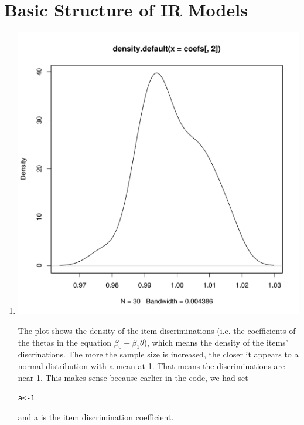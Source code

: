 \documentclass{article}\usepackage[]{graphicx}\usepackage[]{color}
\makeatletter
\def\maxwidth{ %
  \ifdim\Gin@nat@width>\linewidth
    \linewidth
  \else
    \Gin@nat@width
  \fi
}
\newcommand{\hlnum}[1]{\textcolor[rgb]{0.686,0.059,0.569}{#1}}%
\newcommand{\hlstd}[1]{\textcolor[rgb]{0.345,0.345,0.345}{#1}}%
\newcommand{\hlkwb}[1]{\textcolor[rgb]{0.69,0.353,0.396}{#1}}%
\newenvironment{kframe}{%
 \def\at@end@of@kframe{}%
 \ifinner\ifhmode%
  \def\at@end@of@kframe{\end{minipage}}%
  \begin{minipage}{\columnwidth}%
 \fi\fi%
 \def\FrameCommand##1{\hskip\@totalleftmargin \hskip-\fboxsep
 \colorbox{shadecolor}{##1}\hskip-\fboxsep
     \hskip-\linewidth \hskip-\@totalleftmargin \hskip\columnwidth}%
 \MakeFramed {\advance\hsize-\width
   \@totalleftmargin\z@ \linewidth\hsize
   \@setminipage}}%
 {\par\unskip\endMakeFramed%
 \at@end@of@kframe}
\newenvironment{knitrout}{}{} %
\makeatother
\begin{document}
\section{Basic Structure of IR Models}
\begin{enumerate}
\item
\begin{knitrout}
\color{fgcolor}
\includegraphics[width=\maxwidth]{figure/unnamed-chunk-5-1} 

\end{knitrout}
The plot shows the density of the item discriminations (i.e. the coefficients of the thetas in the equation $\beta_0 + \beta_1 \theta$), which means the density of the items' discrinations. The more the sample size is increased, the closer it appears to a normal distribution with a mean at 1. That means the discriminations are near 1. This makes sense because earlier in the code, we had set
\begin{knitrout}
\color{fgcolor}\begin{kframe}
\begin{alltt}
\hlstd{a} \hlkwb{<-} \hlnum{1}
\end{alltt}
\end{kframe}
\end{knitrout}
and a is the item discrimination coefficient.



\end{enumerate}
\end{document}
